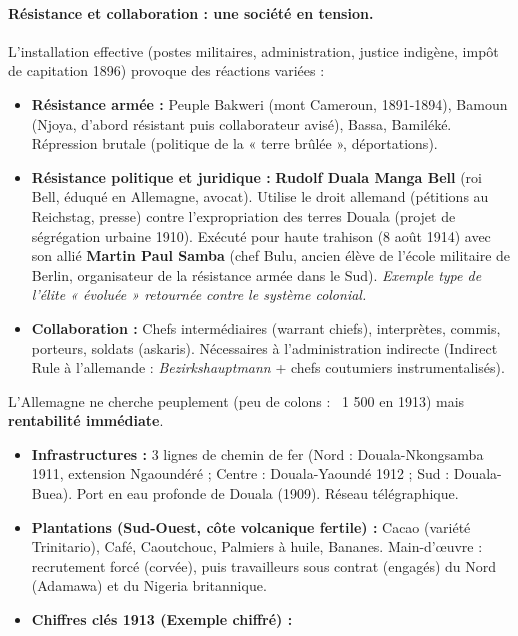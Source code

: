 \documentclass[11pt]{article}
\begin{document}
\paragraph{Résistance et collaboration : une société en tension.}
L'installation effective (postes militaires, administration, justice indigène, impôt de capitation 1896) provoque des réactions variées :
\begin{itemize}
    \item \textbf{Résistance armée :} Peuple Bakweri (mont Cameroun, 1891-1894), Bamoun (Njoya, d'abord résistant puis collaborateur avisé), Bassa, Bamiléké. Répression brutale (politique de la « terre brûlée », déportations).
    \item \textbf{Résistance politique et juridique :} \textbf{Rudolf Duala Manga Bell} (roi Bell, éduqué en Allemagne, avocat). Utilise le droit allemand (pétitions au Reichstag, presse) contre l'expropriation des terres Douala (projet de ségrégation urbaine 1910). Exécuté pour haute trahison (8 août 1914) avec son allié \textbf{Martin Paul Samba} (chef Bulu, ancien élève de l'école militaire de Berlin, organisateur de la résistance armée dans le Sud). \emph{Exemple type de l'élite « évoluée » retournée contre le système colonial.}
    \item \textbf{Collaboration :} Chefs intermédiaires (warrant chiefs), interprètes, commis, porteurs, soldats (askaris). Nécessaires à l'administration indirecte (Indirect Rule à l'allemande : \emph{Bezirkshauptmann} + chefs coutumiers instrumentalisés).
\end{itemize}

\begin{exemplebox}
L'Allemagne ne cherche peuplement (peu de colons : ~1 500 en 1913) mais \textbf{rentabilité immédiate}.
\begin{itemize}
    \item \textbf{Infrastructures :} 3 lignes de chemin de fer (Nord : Douala-Nkongsamba 1911, extension Ngaoundéré ; Centre : Douala-Yaoundé 1912 ; Sud : Douala-Buea). Port en eau profonde de Douala (1909). Réseau télégraphique.
    \item \textbf{Plantations (Sud-Ouest, côte volcanique fertile) :} Cacao (variété Trinitario), Café, Caoutchouc, Palmiers à huile, Bananes. Main-d'œuvre : recrutement forcé (corvée), puis travailleurs sous contrat (engagés) du Nord (Adamawa) et du Nigeria britannique.
    \item \textbf{Chiffres clés 1913 (Exemple chiffré) :}
\end{itemize}
\end{exemplebox}
\end{document}
